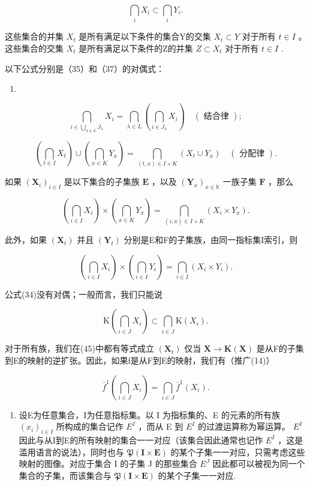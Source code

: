 \[
\bigcap_ {i} X _ {i} \subset \bigcap_ {i} Y _ {i}.
\]

这些集合的并集 \(X_{t}\) 是所有满足以下条件的集合Y的交集 \(X_{t} \subset Y\) 对于所有 \(t \in I\) 。这些集合的交集 \(X_{t}\) 是所有满足以下条件的Z的并集 \(Z \subset X_{t}\) 对于所有 \(t \in I\) .

以下公式分别是（35）和（37）的对偶式：

\begin{enumerate}
\def\labelenumi{(\arabic{enumi})}
\setcounter{enumi}{40}
\tightlist
\item
\end{enumerate}

\[
\bigcap_ {i \in \bigcup_ {\lambda \in L} J _ {\lambda}} X _ {i} = \bigcap_ {\lambda \in L} \left(\bigcap_ {i \in J _ {\lambda}} X _ {i}\right) \quad (\text { 结合律 });\tag{42}
\]

\[
\left(\bigcap_ {t \in I} X _ {t}\right) \cup \left(\bigcap_ {x \in K} Y _ {x}\right) = \bigcap_ {(t, x) \in I \times K} (X _ {t} \cup Y _ {x}) \quad (\text { 分配律 }).
\]

如果 \((\mathbf{X}_i)_{i\in I}\) 是以下集合的子集族 \(\mathbf{E}\) ，以及 \((\mathbf{Y}_x)_{x\in \mathbb{K}}\) 一族子集 \(\mathbf{F}\) ，那么

\[
\left(\bigcap_ {i \in I} X _ {i}\right) \times \left(\bigcap_ {x \in K} Y _ {x}\right) = \bigcap_ {(i, x) \in I \times K} (X _ {i} \times Y _ {x}).\tag{43}
\]

此外，如果 \((\mathbf{X}_{t})\) 并且 \((\mathbf{Y}_{t})\) 分别是E和F的子集族，由同一指标集I索引，则

\[
\left(\bigcap_ {i \in I} X _ {i}\right) \times \left(\bigcap_ {i \in I} Y _ {i}\right) = \bigcap_ {i \in I} (X _ {i} \times Y _ {i}).\tag{44}
\]

公式(34)没有对偶；一般而言，我们只能说

\[
\mathrm{K} \left(\bigcap_ {i \in J} X _ {i}\right) \subset \bigcap_ {i \in J} \mathrm{K} (X _ {i}).\tag{45}
\]

对于所有族，我们在(45)中都有等式成立 \((\mathbf{X}_{t})\) 仅当 \(\mathbf{X} \to \mathbf{K}(\mathbf{X})\) 是从F的子集到E的映射的逆扩张。因此，如果f是从F到E的映射，我们有（推广(14)）

\[
\bar {f} ^ {1} \left(\bigcap_ {i \in J} X _ {i}\right) = \bigcap_ {i \in J} \bar {f} ^ {1} (X _ {i}).\tag{46}
\]

\begin{enumerate}
\def\labelenumi{\arabic{enumi}.}
\setcounter{enumi}{8}
\tightlist
\item
  设E为任意集合，I为任意指标集。以 I 为指标集的、E 的元素的所有族 \((x_{i})_{i\in I}\) 所构成的集合记作 \(E^{I}\) ，而从 E 到 \(E^{I}\) 的过渡运算称为幂运算。 \(E^{I}\) 因此与从I到E的所有映射的集合一一对应（该集合因此通常也记作 \(E^{I}\) ，这是滥用语言的说法），同时也与 \(\mathfrak{P}(\mathbf{I} \times \mathbf{E})\) 的某个子集一一对应，只需考虑这些映射的图像。对应于集合 I 的子集 J 的那些集合 \(E^{J}\) 因此都可以被视为同一个集合的子集，而该集合与 \(\mathfrak{P}(\mathbf{I} \times \mathbf{E})\) 的某个子集一一对应.
\end{enumerate}

